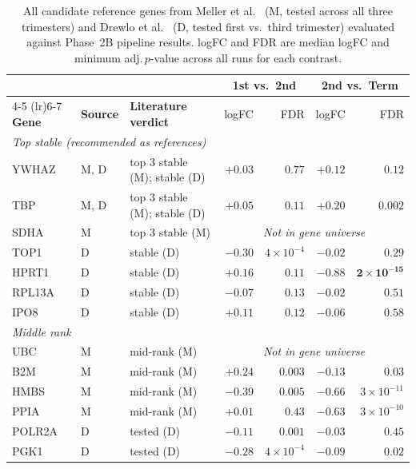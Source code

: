 \documentclass[11pt,a4paper]{article}
\begin{document}
\begin{table}[htbp]
\centering
\caption{All candidate reference genes from Meller et al.~\cite{meller2005}
  (M, tested across all three trimesters) and Drewlo et al.~\cite{drewlo2012}
  (D, tested first vs.\ third trimester) evaluated against Phase~2B
  pipeline results.  logFC and FDR are median logFC and minimum
  adj.\,$p$-value across all runs for each contrast.}
\label{tab:refgenes}
\small
\begin{tabular}{lllrrrr}
\toprule
& & & \multicolumn{2}{c}{\textbf{1st vs.\ 2nd}} &
    \multicolumn{2}{c}{\textbf{2nd vs.\ Term}} \\
\cmidrule(lr){4-5} \cmidrule(lr){6-7}
\textbf{Gene} & \textbf{Source} & \textbf{Literature verdict} &
  logFC & FDR &
  logFC & FDR \\
\midrule
\multicolumn{7}{l}{\textit{Top stable (recommended as references)}} \\
YWHAZ & M, D & top 3 stable (M); stable (D) &
  $+0.03$ & $0.77$ &
  $+0.12$ & $0.12$ \\
TBP & M, D & top 3 stable (M); stable (D) &
  $+0.05$ & $0.11$ &
  $+0.20$ & $0.002$ \\
SDHA & M & top 3 stable (M) &
  \multicolumn{4}{c}{\textit{Not in gene universe}} \\
TOP1 & D & stable (D) &
  $-0.30$ & $4{\times}10^{-4}$ &
  $-0.02$ & $0.29$ \\
HPRT1 & D & stable (D) &
  $+0.16$ & $0.11$ &
  $\mathbf{-0.88}$ & $\mathbf{2{\times}10^{-15}}$ \\
RPL13A & D & stable (D) &
  $-0.07$ & $0.13$ &
  $-0.02$ & $0.51$ \\
IPO8 & D & stable (D) &
  $+0.11$ & $0.12$ &
  $-0.06$ & $0.58$ \\
\midrule
\multicolumn{7}{l}{\textit{Middle rank}} \\
UBC & M & mid-rank (M) &
  \multicolumn{4}{c}{\textit{Not in gene universe}} \\
B2M & M & mid-rank (M) &
  $+0.24$ & $0.003$ &
  $-0.13$ & $0.03$ \\
HMBS & M & mid-rank (M) &
  $-0.39$ & $0.005$ &
  $-0.66$ & $3{\times}10^{-11}$ \\
PPIA & M & mid-rank (M) &
  $+0.01$ & $0.43$ &
  $-0.63$ & $3{\times}10^{-10}$ \\
POLR2A & D & tested (D) &
  $-0.11$ & $0.001$ &
  $-0.03$ & $0.45$ \\
PGK1 & D & tested (D) &
  $-0.28$ & $4{\times}10^{-4}$ &
  $-0.09$ & $0.02$ \\

\end{tabular}
\end{table}
\end{document}
